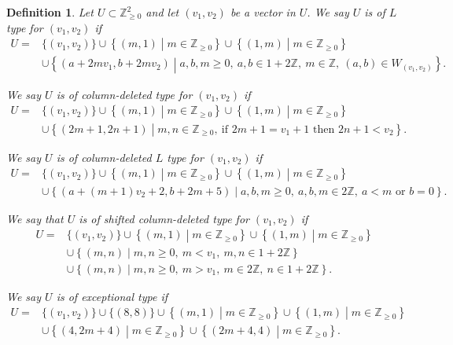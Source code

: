 \documentclass{amsart}
\newcommand{\ZZ}{\mathbb{Z}}
\theoremstyle{theorem}
\newtheorem{definition}{Definition}[section]
\theoremstyle{definition}
\begin{document}
\begin{definition}
Let $U \subset \ZZ_{\geq 0}^2$ and let $(v_1, v_2)$ be a vector in $U$. We say $U$ is of $L$ \emph{type for} $(v_1, v_2)$ if
	\begin{align*}
    U = &\{(v_1,v_2)\} \cup \left\{(m,1) \middle| m \in \ZZ_{\geq 0}\right\} \cup \left\{(1,m) \middle| m \in \ZZ_{\geq 0}\right\} \\
    &\cup \left\{(a + 2m v_1, b + 2m v_2) \middle| a,b,m \geq 0, \ a,b \in 1 + 2\ZZ, \ m \in \ZZ, \ (a,b) \in W_{(v_1,v_2)}\right\}.
    \end{align*}
    
\noindent We say $U$ is of \emph{column-deleted type for} $(v_1, v_2)$ if
	\begin{align*}
    U = & \{(v_1, v_2)\} \cup \left\{(m,1) \middle| m \in \ZZ_{\geq 0}\right\} \cup \left\{(1,m) \middle| m \in \ZZ_{\geq 0}\right\} \\
    &\cup \left\{(2m + 1, 2n + 1) \middle| m,n \in \ZZ_{\geq 0}, \ \text{if } 2m + 1 = v_1 + 1 \text{ then } 2n + 1 < v_2\right\}.
    \end{align*}
    
\noindent We say $U$ is of \emph{column-deleted} $L$ \emph{type for} $(v_1, v_2)$ if
	\begin{align*}
    U = &\{(v_1, v_2)\} \cup \left\{(m,1) \middle| m \in \ZZ_{\geq 0}\right\} \cup \left\{(1,m) \middle| m \in \ZZ_{\geq 0}\right\} \\
    &\cup \left\{(a + (m + 1) v_2 + 2, b + 2m + 5) \middle| a,b,m \geq 0, \ a,b,m \in 2\ZZ, \ a < m \text{ or } b = 0\right\}.
    \end{align*}
    
\noindent We say that $U$ is of \emph{shifted column-deleted type for} $(v_1, v_2)$ if
	\begin{align*}
    U = & \{(v_1, v_2)\} \cup \left\{(m,1) \middle| m \in \ZZ_{\geq 0}\right\} \cup \left\{(1,m) \middle| m \in \ZZ_{\geq 0}\right\} \\
    &\cup \left\{(m, n) \middle| m,n \geq 0, \ m < v_1, \ m,n \in 1 + 2\ZZ\right\} \\
    &\cup \left\{(m, n) \middle| m,n \geq 0, \ m > v_1, \ m \in 2\ZZ, \ n \in 1 + 2\ZZ\right\}.
    \end{align*}
    
\noindent We say $U$ is of \emph{exceptional type} if
	\begin{align*}
    U = &\{(v_1, v_2)\} \cup \{(8,8)\} \cup \left\{(m,1) \middle| m \in \ZZ_{\geq 0}\right\} \cup \left\{(1,m) \middle| m \in \ZZ_{\geq 0}\right\} \\
    &\cup \left\{(4, 2m + 4) \middle| m \in \ZZ_{\geq 0}\right\} \cup \left\{(2m + 4,4) \middle| m \in \ZZ_{\geq 0}\right\}.
    \end{align*}
\end{definition}
\end{document}
